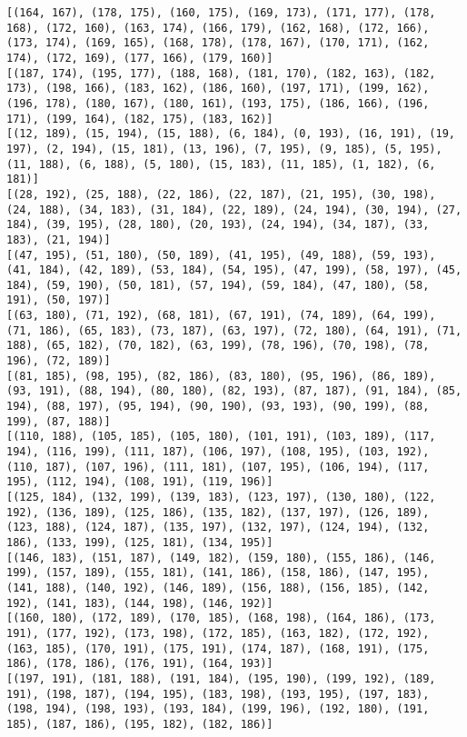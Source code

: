 \documentclass[11pt]{article}
\begin{document}
\begin{Verbatim}[commandchars=\\\{\}]
[(164, 167), (178, 175), (160, 175), (169, 173), (171, 177), (178, 168), (172, 160), (163, 174), (166, 179), (162, 168), (172, 166), (173, 174), (169, 165), (168, 178), (178, 167), (170, 171), (162, 174), (172, 169), (177, 166), (179, 160)]
[(187, 174), (195, 177), (188, 168), (181, 170), (182, 163), (182, 173), (198, 166), (183, 162), (186, 160), (197, 171), (199, 162), (196, 178), (180, 167), (180, 161), (193, 175), (186, 166), (196, 171), (199, 164), (182, 175), (183, 162)]
[(12, 189), (15, 194), (15, 188), (6, 184), (0, 193), (16, 191), (19, 197), (2, 194), (15, 181), (13, 196), (7, 195), (9, 185), (5, 195), (11, 188), (6, 188), (5, 180), (15, 183), (11, 185), (1, 182), (6, 181)]
[(28, 192), (25, 188), (22, 186), (22, 187), (21, 195), (30, 198), (24, 188), (34, 183), (31, 184), (22, 189), (24, 194), (30, 194), (27, 184), (39, 195), (28, 180), (20, 193), (24, 194), (34, 187), (33, 183), (21, 194)]
[(47, 195), (51, 180), (50, 189), (41, 195), (49, 188), (59, 193), (41, 184), (42, 189), (53, 184), (54, 195), (47, 199), (58, 197), (45, 184), (59, 190), (50, 181), (57, 194), (59, 184), (47, 180), (58, 191), (50, 197)]
[(63, 180), (71, 192), (68, 181), (67, 191), (74, 189), (64, 199), (71, 186), (65, 183), (73, 187), (63, 197), (72, 180), (64, 191), (71, 188), (65, 182), (70, 182), (63, 199), (78, 196), (70, 198), (78, 196), (72, 189)]
[(81, 185), (98, 195), (82, 186), (83, 180), (95, 196), (86, 189), (93, 191), (88, 194), (80, 180), (82, 193), (87, 187), (91, 184), (85, 194), (88, 197), (95, 194), (90, 190), (93, 193), (90, 199), (88, 199), (87, 188)]
[(110, 188), (105, 185), (105, 180), (101, 191), (103, 189), (117, 194), (116, 199), (111, 187), (106, 197), (108, 195), (103, 192), (110, 187), (107, 196), (111, 181), (107, 195), (106, 194), (117, 195), (112, 194), (108, 191), (119, 196)]
[(125, 184), (132, 199), (139, 183), (123, 197), (130, 180), (122, 192), (136, 189), (125, 186), (135, 182), (137, 197), (126, 189), (123, 188), (124, 187), (135, 197), (132, 197), (124, 194), (132, 186), (133, 199), (125, 181), (134, 195)]
[(146, 183), (151, 187), (149, 182), (159, 180), (155, 186), (146, 199), (157, 189), (155, 181), (141, 186), (158, 186), (147, 195), (141, 188), (140, 192), (146, 189), (156, 188), (156, 185), (142, 192), (141, 183), (144, 198), (146, 192)]
[(160, 180), (172, 189), (170, 185), (168, 198), (164, 186), (173, 191), (177, 192), (173, 198), (172, 185), (163, 182), (172, 192), (163, 185), (170, 191), (175, 191), (174, 187), (168, 191), (175, 186), (178, 186), (176, 191), (164, 193)]
[(197, 191), (181, 188), (191, 184), (195, 190), (199, 192), (189, 191), (198, 187), (194, 195), (183, 198), (193, 195), (197, 183), (198, 194), (198, 193), (193, 184), (199, 196), (192, 180), (191, 185), (187, 186), (195, 182), (182, 186)]

    \end{Verbatim}
\end{document}
